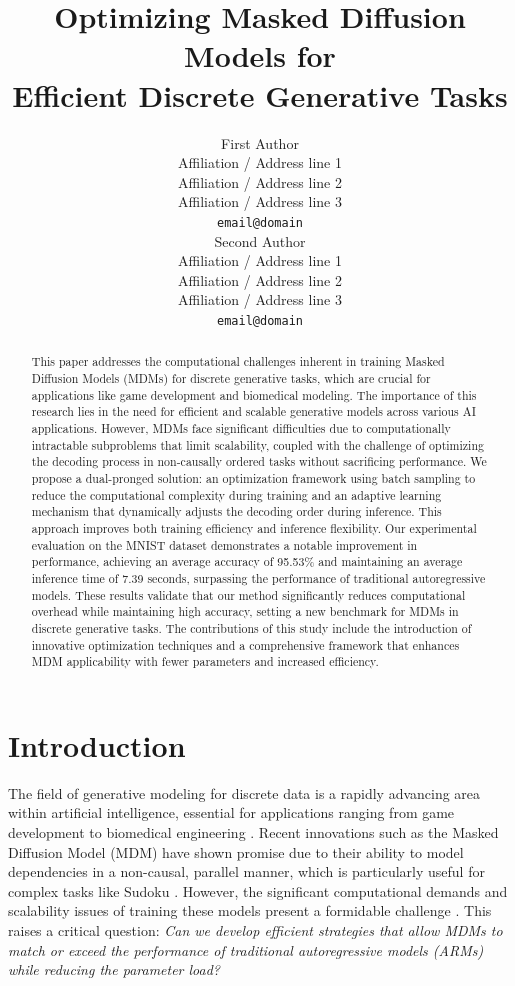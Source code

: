 \documentclass{article} %
\title{Optimizing Masked Diffusion Models for \\ Efficient Discrete Generative Tasks}
\author{First Author \\
  Affiliation / Address line 1 \\
  Affiliation / Address line 2 \\
  Affiliation / Address line 3 \\
  \texttt{email@domain} \\\And
  Second Author \\
  Affiliation / Address line 1 \\
  Affiliation / Address line 2 \\
  Affiliation / Address line 3 \\
  \texttt{email@domain} \\}
\begin{document}
\maketitle
\begin{abstract}
This paper addresses the computational challenges inherent in training Masked Diffusion Models (MDMs) for discrete generative tasks, which are crucial for applications like game development and biomedical modeling. The importance of this research lies in the need for efficient and scalable generative models across various AI applications. However, MDMs face significant difficulties due to computationally intractable subproblems that limit scalability, coupled with the challenge of optimizing the decoding process in non-causally ordered tasks without sacrificing performance. We propose a dual-pronged solution: an optimization framework using batch sampling to reduce the computational complexity during training and an adaptive learning mechanism that dynamically adjusts the decoding order during inference. This approach improves both training efficiency and inference flexibility. Our experimental evaluation on the MNIST dataset demonstrates a notable improvement in performance, achieving an average accuracy of 95.53\% and maintaining an average inference time of 7.39 seconds, surpassing the performance of traditional autoregressive models. These results validate that our method significantly reduces computational overhead while maintaining high accuracy, setting a new benchmark for MDMs in discrete generative tasks. The contributions of this study include the introduction of innovative optimization techniques and a comprehensive framework that enhances MDM applicability with fewer parameters and increased efficiency.
\end{abstract}


\section{Introduction}

The field of generative modeling for discrete data is a rapidly advancing area within artificial intelligence, essential for applications ranging from game development to biomedical engineering \cite{genmol2025,adaptive2025}. Recent innovations such as the Masked Diffusion Model (MDM) have shown promise due to their ability to model dependencies in a non-causal, parallel manner, which is particularly useful for complex tasks like Sudoku \cite{masked2024,maskmamba2024}. However, the significant computational demands and scalability issues of training these models present a formidable challenge \cite{simplified2024}. This raises a critical question: \textit{Can we develop efficient strategies that allow MDMs to match or exceed the performance of traditional autoregressive models (ARMs) while reducing the parameter load?}
\end{document}
